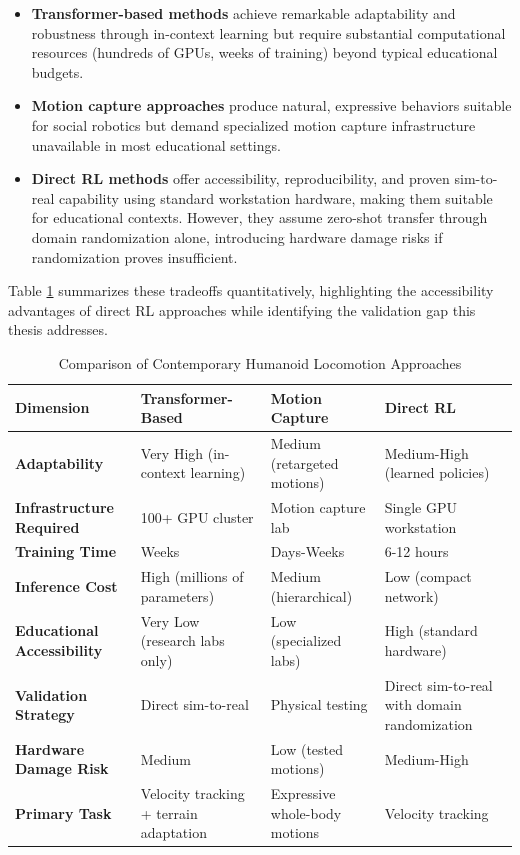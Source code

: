 \documentclass[12pt,a4paper]{article}
\begin{document}
\begin{itemize}
\item \textbf{Transformer-based methods} \parencite{radosavovic2024realworld, radosavovic2024challenging} achieve remarkable adaptability and robustness through in-context learning but require substantial computational resources (hundreds of GPUs, weeks of training) beyond typical educational budgets.

\item \textbf{Motion capture approaches} \parencite{cheng2024expressive} produce natural, expressive behaviors suitable for social robotics but demand specialized motion capture infrastructure unavailable in most educational settings.

\item \textbf{Direct RL methods} \parencite{gu2024humanoidgym} offer accessibility, reproducibility, and proven sim-to-real capability using standard workstation hardware, making them suitable for educational contexts. However, they assume zero-shot transfer through domain randomization alone, introducing hardware damage risks if randomization proves insufficient.
\end{itemize}

Table \ref{tab:rl_comparison} summarizes these tradeoffs quantitatively, highlighting the accessibility advantages of direct RL approaches while identifying the validation gap this thesis addresses.

\begin{table}[H]
\centering
\caption{Comparison of Contemporary Humanoid Locomotion Approaches}
\label{tab:rl_comparison}
\footnotesize
\begin{tabular}{p{2.8cm}|p{3.5cm}|p{3.2cm}|p{3.8cm}}
\hline
\textbf{Dimension} & \textbf{Transformer-Based} \parencite{radosavovic2024realworld} & \textbf{Motion Capture} \parencite{cheng2024expressive} & \textbf{Direct RL} \parencite{gu2024humanoidgym} \\
\hline
\hline
\textbf{Adaptability} & Very High (in-context learning) & Medium (retargeted motions) & Medium-High (learned policies) \\
\hline
\textbf{Infrastructure Required} & 100+ GPU cluster & Motion capture lab & Single GPU workstation \\
\hline
\textbf{Training Time} & Weeks & Days-Weeks & 6-12 hours \\
\hline
\textbf{Inference Cost} & High (millions of parameters) & Medium (hierarchical) & Low (compact network) \\
\hline
\textbf{Educational Accessibility} & Very Low (research labs only) & Low (specialized labs) & High (standard hardware) \\
\hline
\textbf{Validation Strategy} & Direct sim-to-real & Physical testing & Direct sim-to-real with domain randomization \\
\hline
\textbf{Hardware Damage Risk} & Medium & Low (tested motions) & Medium-High \\
\hline
\textbf{Primary Task} & Velocity tracking + terrain adaptation & Expressive whole-body motions & Velocity tracking \\
\hline
\end{tabular}
\end{table}
\end{document}
